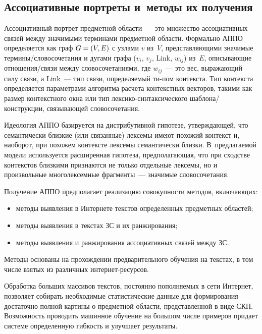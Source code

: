 \begin{multicols}{2}
   \section{Ассоциативные портреты и~методы их получения}
    
     Ассоциативный портрет предметной области~--- это 
множество ассоциативных связей между значимыми терминами 
предметной об\-ласти. Формально АППО определяется как граф 
$G \hm= (V, E)$ с узлами $v$ из~$V$, представляющими значимые 
термины/словосочетания и дугами графа ($v_i$, $v_j$, Link, $w_{ij}$)\linebreak 
из~$E$, описывающие отношения/связи между словосочетаниями, где 
$w_{ij}$~--- это вес, выражающий силу связи, а 
     Link~--- тип связи, определяемый ти-\linebreak пом контекста. Тип контекста 
определяется параметрами алгоритма расчета контекстных векторов, 
такими как размер контекстного окна или тип лек\-си\-ко-син\-так\-си\-че\-ско\-го 
шаблона/конструкции, связывающей словосочетания. 
     
     Идеология АППО базируется на дистрибутивной гипотезе, 
утверждающей, что семантически близкие (или связанные) лексемы имеют 
похожий контекст и, наоборот, при похожем контексте лексемы 
семантически близки. В~предлагаемой модели используется расширенная 
гипотеза, пред\-по\-ла\-га\-ющая, что при сходстве контекстов близкими 
признаются не только отдельные лексемы, но и произвольные 
многолексемные фрагменты~--- значимые словосочетания.
     
     Получение АППО предполагает реализацию совокупности методов, 
включающих:
     \begin{itemize}
     \item методы выявления в Интернете текстов определенных 
предметных областей;
     \item методы выявления в текстах ЗС и их 
ранжирования;
     \item методы выявления и ранжирования ассоциативных связей 
между ЗС.\end{itemize}
     
     Методы основаны на прохождении предварительного обучения на 
текстах, в том числе взятых из различных интернет-ресурсов.
     
     Обработка больших массивов текстов, постоянно пополняемых в сети 
Интернет, позволяет собирать необходимые статистические данные для\linebreak 
формирования достаточно полной картины о предметной области, 
представленной в виде СКП. Возмож\-ность проводить машинное обучение 
на большом числе примеров придает системе определенную гибкость и 
улучшает результаты. 


\end{multicols}

